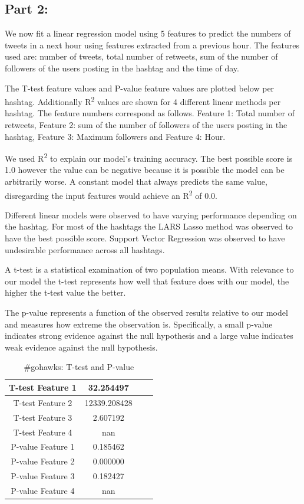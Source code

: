 \documentclass[12pt]{article}
\begin{document}
\subsection{Part 2:}

We now fit a linear regression model using 5 features to predict the numbers of tweets in a next hour using features extracted from a previous hour. The features used are: number of tweets, total number of retweets, sum of the number of followers of the users posting in the hashtag and the time of day.

The T-test feature values and P-value feature values are plotted below per hashtag. Additionally R\textsuperscript2 values are shown for 4 different linear methods per hashtag. The feature numbers correspond as follows. Feature 1: Total number of retweets, Feature 2:  sum of the number of followers of the users posting in the hashtag, Feature 3:  Maximum followers and Feature 4: Hour.

We used R\textsuperscript2 to explain our model's training accuracy. The best possible score is 1.0 however the value can be negative because it is possible the model can be arbitrarily worse. A constant model that always predicts the same value, disregarding the input features would achieve an R\textsuperscript2 of 0.0.

Different linear models were observed to have varying performance depending on the hashtag. For most of the hashtags the LARS Lasso method was observed to have the best possible score. Support Vector Regression was observed to have undesirable performance across all hashtags.

A t-test is a statistical examination of two population means. With relevance to our model the t-test represents how well that feature does with our model, the higher the t-test value the better.

The p-value represents a function of the observed results relative to our model and measures how extreme the observation is. Specifically, a small p-value indicates strong evidence against the null hypothesis and a large value indicates weak evidence against the null hypothesis.


\begin{table}[H]
	\centering
	\begin{tabular}{| c | c | c | c |}
		\hline 
		T-test Feature 1 & 32.254497 \\\hline
		T-test Feature 2 & 12339.208428 \\\hline
		T-test Feature 3 & 2.607192 \\\hline 
		T-test Feature 4 & nan \\\hline
		P-value Feature 1 & 0.185462 \\\hline
		P-value Feature 2 & 0.000000 \\\hline
		P-value Feature 3 & 0.182427 \\\hline
		P-value Feature 4 & nan \\\hline
	\end{tabular} 
	\caption{\#gohawks: T-test and P-value}
	\label{part1:tab1}
\end{table} 
\end{document}
